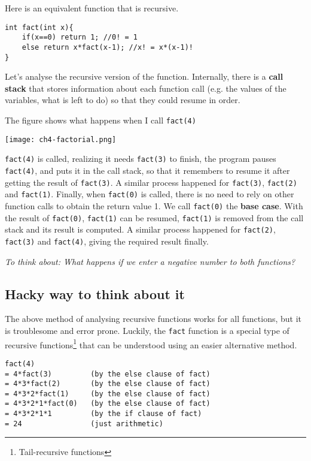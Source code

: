 Here is an equivalent function that is recursive.

\begin{lstlisting}
int fact(int x){
    if(x==0) return 1; //0! = 1
    else return x*fact(x-1); //x! = x*(x-1)!
}
\end{lstlisting}

Let's analyse the recursive version of the function. Internally, there is a \textbf{call stack} that stores information about each function call (e.g. the values of the variables, what is left to do) so that they could resume in order.

The figure shows what happens when I call \texttt{fact(4)}

\texttt{[image: ch4-factorial.png]}

\texttt{fact(4)} is called, realizing it needs \texttt{fact(3)} to finish, the program pauses \texttt{fact(4)}, and puts it in the call stack, so that it remembers to resume it after getting the result of \texttt{fact(3)}. A similar process happened for \texttt{fact(3)}, \texttt{fact(2)} and \texttt{fact(1)}. Finally, when \texttt{fact(0)} is called, there is no need to rely on other function calls to obtain the return value 1. We call \texttt{fact(0)} the \textbf{base case}. With the result of \texttt{fact(0)}, \texttt{fact(1)} can be resumed, \texttt{fact(1)} is removed from the call stack and its result is computed. A similar process happened for \texttt{fact(2)}, \texttt{fact(3)} and \texttt{fact(4)}, giving the required result finally.
\vspace{6mm}

\textit{To think about: What happens if we enter a negative number to both functions?}

\subsection*{Hacky way to think about it}
The above method of analysing recursive functions works for all functions, but it is troublesome and error prone. Luckily, the \texttt{fact} function is a special type of recursive functions\footnote{Tail-recursive functions} that can be understood using an easier alternative method.

\begin{lstlisting}
fact(4)
= 4*fact(3)         (by the else clause of fact)
= 4*3*fact(2)       (by the else clause of fact)
= 4*3*2*fact(1)     (by the else clause of fact)
= 4*3*2*1*fact(0)   (by the else clause of fact)
= 4*3*2*1*1         (by the if clause of fact)
= 24                (just arithmetic)
\end{lstlisting}

